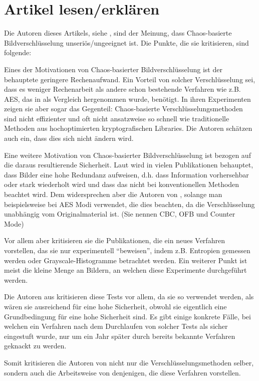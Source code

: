 \section{Artikel lesen/erklären}
Die Autoren dieses Artikels, siehe \cite{chaos}, sind der Meinung, dass Chaos-basierte Bildverschlüsselung
unseriös/ungeeignet ist. Die Punkte, die sie kritisieren, sind folgende:

Eines der Motivationen von Chaos-basierter Bildverschlüsselung ist der behauptete geringere Rechenaufwand.
Ein Vorteil von solcher Verschlüsselung sei, dass es weniger Rechenarbeit als andere schon bestehende
Verfahren wie z.B. AES, das in \cite{chaos} als Vergleich hergenommen wurde, benötigt. In ihren Experimenten
zeigen sie aber sogar das Gegenteil: Chaos-basierte Verschlüsselungsmethoden sind nicht effizienter und oft
nicht ansatzweise so schnell wie traditionelle Methoden aus hochoptimierten kryptografischen Libraries. Die Autoren
schätzen auch ein, dass dies sich nicht ändern wird.

Eine weitere Motivation von Chaos-basierter Bildverschlüsselung ist bezogen auf die daraus resultierende Sicherheit.
Laut \cite{chaos} wird in vielen Publikationen behauptet, dass Bilder eine hohe Redundanz aufweisen, d.h. dass Information vorhersehbar oder
stark wiederholt wird und dass das nicht bei konventionellen Methoden beachtet wird. Dem widersprechen aber die Autoren von \cite{chaos},
solange man beispielsweise bei AES Modi verwendet, die dies beachten, da die Verschlüsselung unabhängig vom Originalmaterial ist. (Sie nennen
CBC, OFB und Counter Mode)

Vor allem aber kritisieren sie die Publikationen, die ein neues Verfahren vorstellen, das sie
nur experimentell ``beweisen'', indem z.B. Entropien gemessen werden
oder Grayscale-Histogramme betrachtet werden. Ein weiterer Punkt ist meist die kleine Menge an Bildern, an welchen diese Experimente durchgeführt werden.

Die Autoren aus \cite{chaos} kritisieren diese Tests vor allem, da sie so verwendet werden, als wären sie ausreichend für eine hohe Sicherheit, obwohl
sie eigentlich eine Grundbedingung für eine hohe Sicherheit sind. Es gibt einige konkrete Fälle, bei welchen ein Verfahren nach dem Durchlaufen
von solcher Tests als sicher eingestuft wurde, nur um ein Jahr später durch bereits bekannte Verfahren geknackt zu werden.

Somit kritisieren die Autoren von \cite{chaos} nicht nur die Verschlüsselungsmethoden selber, sondern auch die Arbeitsweise von denjenigen, die
diese Verfahren vorstellen.

